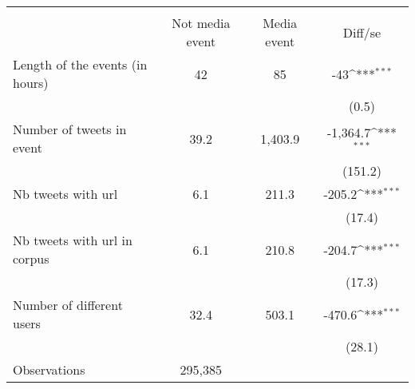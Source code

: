 {
\def\sym#1{\ifmmode^{#1}\else\(^{#1}\)\fi}
\begin{tabular}{l*{1}{ccc}}
\hline\hline
                    &\multicolumn{3}{c}{ }                          \\
                    &Not media event& Media event&     Diff/se         \\
\hline
Length of the events (in hours)&          42&          85&         -43\sym{***}\\
                    &            &            &       (0.5)         \\
Number of tweets in event&        39.2&     1,403.9&    -1,364.7\sym{***}\\
                    &            &            &     (151.2)         \\
Nb tweets with url  &         6.1&       211.3&      -205.2\sym{***}\\
                    &            &            &      (17.4)         \\
Nb tweets with url in corpus&         6.1&       210.8&      -204.7\sym{***}\\
                    &            &            &      (17.3)         \\
Number of different users&        32.4&       503.1&      -470.6\sym{***}\\
                    &            &            &      (28.1)         \\
\hline
Observations        &     295,385&            &                     \\
\hline\hline
\end{tabular}
}
